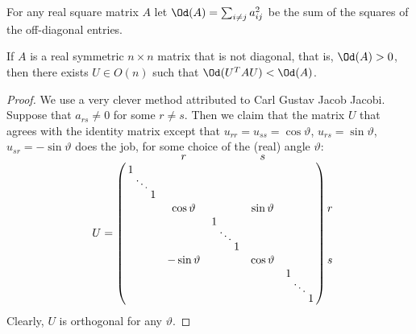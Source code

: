 For any real square matrix $A$ let $\Od(A) = \sum_{i \ne j} a_{ij}^2$ be the sum of the squares of the off-diagonal entries.

\begin{lemma}
  \label{ch7.lemma}
  If $A$ is a real symmetric $n \times n$ matrix that is not diagonal, that is,
  $\Od(A) > 0$, then there exists $U \in O(n)$ such that $\Od(U^T A U) < \Od(A)$.
\end{lemma}
\begin{proof}
  We use a very clever method attributed to Carl Gustav Jacob Jacobi.
  Suppose that $a_{rs} \ne 0$ for some $r \ne s$.
  Then we claim that the matrix $U$ that agrees with the identity matrix except that $u_{rr} = u_{ss} = \cos \vartheta$,
  $u_{rs} = \sin \vartheta$, $u_{sr} = -\sin \vartheta$ does the job, for some choice of the (real) angle $\vartheta$:\vspace{1em}
  \[
  U = \left(\begin{array}{@{\,}ccccc@{\hspace{12pt}}l}
   & \smash{\vbox to 0pt{\vss\hbox{$r$}\vskip 1em}} & & \smash{\vbox to 0pt{\vss\hbox{$s$}\vskip 1em}} & & \\[-1em]
   \begin{array}{@{}c@{\,}c@{\,}c@{}} 1&&\\[-1ex]&\ddots &\\[-1ex]&&1\end{array} & & & & & \\
   & \cos \vartheta & & \sin \vartheta & & r \\
   & & \begin{array}{@{}c@{\,}c@{\,}c@{}} 1&&\\[-1ex]&\ddots &\\[-1ex]&&1\end{array} & & & \\
   & -\sin \vartheta & & \cos \vartheta & & s\\
   & & & & \begin{array}{@{}c@{\,}c@{\,}c@{}} 1&&\\[-1ex]&\ddots &\\[-1ex]&&1\end{array} & \\
  \end{array}\kern-20pt\right)
  \]
  Clearly, $U$ is orthogonal for any $\vartheta$.


\end{proof}
